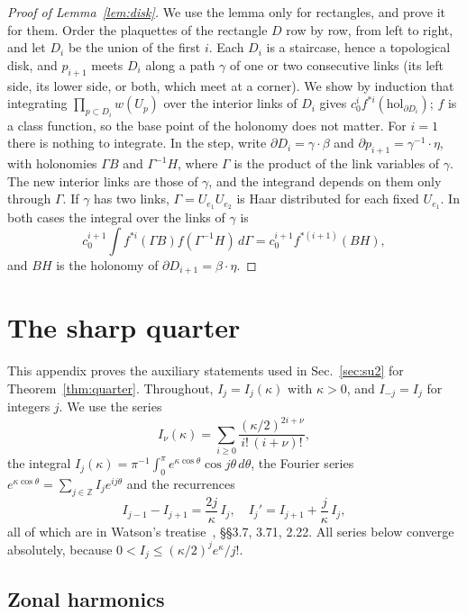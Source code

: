 \documentclass[aps,prd,twocolumn,superscriptaddress,nofootinbib,longbibliography,floatfix,amsmath,amssymb,10pt]{revtex4-2}
\theoremstyle{definition}
\theoremstyle{remark}
\newcommand{\Z}{\mathbb{Z}}
\begin{document}
\begin{proof}[Proof of Lemma~\ref{lem:disk}]
We use the lemma only for rectangles, and prove it for them. Order the
plaquettes of the rectangle $D$ row by row, from left to right, and let
$D_i$ be the union of the first $i$. Each $D_i$ is a staircase, hence a
topological disk, and $p_{i+1}$ meets $D_i$ along a path $\gamma$ of one or
two consecutive links (its left side, its lower side, or both, which meet at
a corner). We show by induction that integrating $\prod_{p\subset D_i}w(U_p)$
over the interior links of $D_i$ gives $c_0^if^{*i}(\mathrm{hol}_{\partial
D_i})$; $f$ is a class function, so the base point of the holonomy does not
matter. For $i=1$ there is nothing to integrate. In the step, write
$\partial D_i=\gamma\cdot\beta$ and $\partial p_{i+1}=\gamma^{-1}\cdot\eta$,
with holonomies $\Gamma B$ and $\Gamma^{-1}H$, where $\Gamma$ is the product of
the link variables of $\gamma$. The new interior links are those of $\gamma$,
and the integrand depends on them only through $\Gamma$. If $\gamma$ has two
links, $\Gamma=U_{e_1}U_{e_2}$ is Haar distributed for each fixed $U_{e_1}$.
In both cases the integral over the links of $\gamma$ is
\[
c_0^{i+1}\int f^{*i}(\Gamma B)f(\Gamma^{-1}H)\,d\Gamma=c_0^{i+1}f^{*(i+1)}(BH),
\]
and $BH$ is the holonomy of $\partial D_{i+1}=\beta\cdot\eta$.
\end{proof}

\section{The sharp quarter}\label{app:quarter}

This appendix proves the auxiliary statements used in Sec.~\ref{sec:su2}
for Theorem~\ref{thm:quarter}. Throughout, $I_j=I_j(\kappa)$ with $\kappa>0$,
and $I_{-j}=I_j$ for integers $j$. We use the series
\[
I_\nu(\kappa)=\sum_{i\ge0}\frac{(\kappa/2)^{2i+\nu}}{i!\,(i+\nu)!},
\]
the integral $I_j(\kappa)=\pi^{-1}\int_0^\pi e^{\kappa\cos\theta}\cos
j\theta\,d\theta$, the Fourier series $e^{\kappa\cos\theta}=\sum_{j\in\Z}
I_je^{ij\theta}$ and the recurrences
\begin{equation}\label{eq:besselrec}
I_{j-1}-I_{j+1}=\frac{2j}\kappa\,I_j,\quad I_j'=I_{j+1}+\frac j\kappa\,I_j ,
\end{equation}
all of which are in Watson's treatise~\cite{Wat44}, \S\S3.7, 3.71,
2.22. All series below converge absolutely, because $0<I_j\le(\kappa/2)^j
e^\kappa/j!$.

\subsection{Zonal harmonics}
\end{document}
